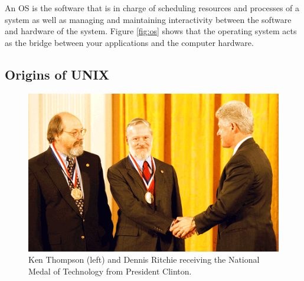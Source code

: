 An OS is the software that is in charge of scheduling resources and processes 
of a system as well as managing and maintaining interactivity between the
software and hardware of the system. Figure \ref{fig:os} shows that the
operating system acts as the bridge between your applications and the computer
hardware.  

\subsection{Origins of UNIX}

\begin{frame}
\end{frame}

\begin{frame}
\begin{figure}
\begin{center}\includegraphics[width=0.7\linewidth]{dennis-ken3}\end{center}
\caption{Ken Thompson (left) and Dennis Ritchie receiving the National Medal of
Technology from President Clinton.}
\label{fig:medal}
\end{figure}
\end{frame}

